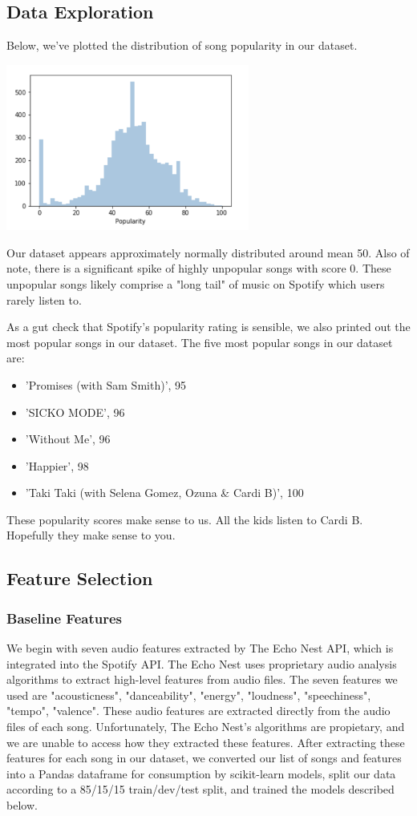 \documentclass[journal]{IEEEtran}
\begin{document}
\subsection{Data Exploration}

Below, we've plotted the distribution of song popularity in our dataset.

\includegraphics[width=8cm]{popularity_distribution}

Our dataset appears approximately normally distributed around mean 50. Also of note, there is a significant spike of highly unpopular songs with score 0. These unpopular songs likely comprise a "long tail" of music on Spotify which users rarely listen to.

As a gut check that Spotify's popularity rating is sensible, we also printed out the most popular songs in our dataset. The five most popular songs in our dataset are:
\begin{itemize}
  \item 'Promises (with Sam Smith)', 95
  \item 'SICKO MODE', 96
  \item 'Without Me', 96
  \item 'Happier', 98
  \item 'Taki Taki (with Selena Gomez, Ozuna & Cardi B)', 100
\end{itemize}

These popularity scores make sense to us. All the kids listen to Cardi B. Hopefully they make sense to you.

\subsection{Feature Selection}
\subsubsection{Baseline Features}
We begin with seven audio features extracted by The Echo Nest API, which is integrated into the Spotify API. The Echo Nest uses proprietary audio analysis algorithms to extract high-level features from audio files. The seven features we used are "acousticness", "danceability", "energy", "loudness", "speechiness", "tempo", "valence". These audio features are extracted directly from the audio files of each song. Unfortunately, The Echo Nest's algorithms are propietary, and we are unable to access how they extracted these features.
After extracting these features for each song in our dataset, we converted our list of songs and features into a Pandas dataframe for consumption by scikit-learn models, split our data according to a 85/15/15 train/dev/test split, and trained the models described below.
\end{document}
